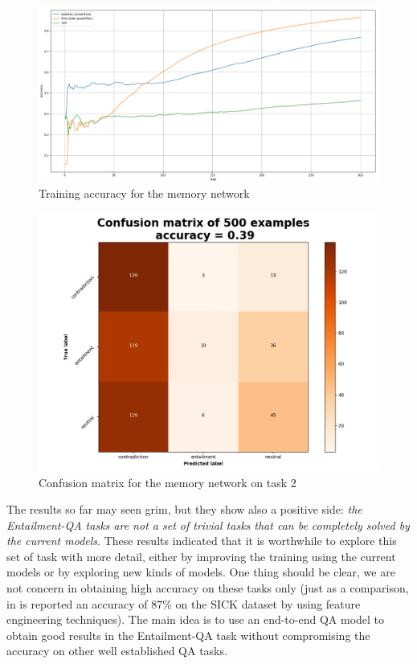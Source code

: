 \begin{center}
\begin{figure}[h]
\includegraphics[width=13.0cm]{img/training_acc_EntailQA_mem.png}
\caption{Training accuracy for the memory network}
\end{figure}
\end{center}


\begin{center}
\begin{figure}[h]
\includegraphics[width=13.0cm]{img/cm_mem_EntailQA2.png}
\caption{Confusion matrix for the memory network on task 2}
\end{figure}
\end{center}


The results so far may seen grim, but they show also a positive side: \textit{the Entailment-QA tasks are not a set of trivial tasks that can be completely solved by the current models}. These results indicated that it is worthwhile to explore this set of task with more detail, either by improving the training using the current models or by exploring new kinds of models. One thing should be clear, we are not concern in obtaining high accuracy on these tasks only (just as a comparison, in \cite{S14-2055} is reported an accuracy of $87\%$ on the SICK dataset by using feature engineering techniques). The main idea is to use an end-to-end QA model to obtain good results in the Entailment-QA task without compromising the accuracy on other well established QA tasks.  


